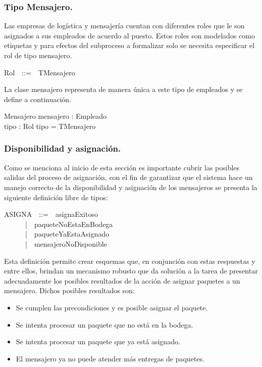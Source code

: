 \documentclass[12pt,a4paper,table]{article}
\begin{document}
\subsubsection{Tipo Mensajero.}
Las empresas de logística y mensajería cuentan con diferentes roles que le son asignados a sus empleados de acuerdo al puesto. Estos roles son modelados como etiquetas y para efectos del subproceso a formalizar solo se necesita especificar el rol de tipo mensajero.

\begin{zed}
Rol~~::=~~TMensajero
\end{zed}

La clase mensajero representa de manera única a este tipo de empleados y se define a continuación.

\begin{schema}{Mensajero}
mensajero : Empleado\\
tipo : Rol
\where
tipo = TMensajero
\end{schema}

\subsubsection{Disponibilidad y asignación.}
Como se menciona al inicio de esta sección es importante cubrir las posibles salidas del proceso de asignación, con el fin de garantizar que el sistema hace un manejo correcto de la disponibilidad y asignación de los mensajeros se presenta la siguiente definición libre de tipos:

\begin{zed}
ASIGNA~~::=~~asignaExitoso\\
~~~~~~|~~paqueteNoEstaEnBodega\\
~~~~~~|~~paqueteYaEstaAsignado\\
~~~~~~|~~mensajeroNoDisponible\\
\end{zed}

Esta definición permite crear esquemas que, en conjunción con estas respuestas y entre ellos, brindan un mecanismo robusto que da solución a la tarea de presentar adecuadamente los posibles resultados de la acción de asignar paquetes a un mensajero. Dichos posibles resultados son:
\begin{itemize}
\item Se cumplen las precondiciones y es posible asignar el paquete.
\item Se intenta procesar un paquete que no está en la bodega.
\item Se intenta procesar un paquete que ya está asignado.
\item El mensajero ya no puede atender más entregas de paquetes.
\end{itemize} 
\end{document}
